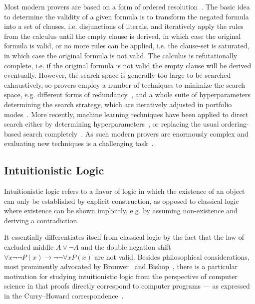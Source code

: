 \documentclass{article}
\theoremstyle{definition}
\theoremstyle{definition}
\theoremstyle{definition}
\theoremstyle{definition}
\theoremstyle{definition}
\theoremstyle{definition}
\theoremstyle{definition}
\newcommand{\0}{\mathbf 0}
\newcommand{\1}{\mathbf 1}
\begin{document}
	Most modern provers are based on a form of ordered resolution~\cite{bachmair2001resolution}. The basic idea to determine the validity of a given formula is to transform the negated formula into a set of clauses, i.e. disjunctions of literals, and iteratively apply the rules from the calculus until the empty clause is derived, in which case the original formula is valid, or no more rules can be applied, i.e. the clause-set is saturated, in which case the original formula is not valid. The calculus is refutationally complete, i.e. if the original formula is not valid the empty clause will be derived eventually. However, the search space is generally too large to be searched exhaustively, so provers employ a number of techniques to minimize the search space, e.g. different forms of redundancy~\cite{bachmair1994rewrite, hillenbrand2013search, gleiss2020subsumption}, and a whole suite of hyperparameters determining the search strategy, which are iteratively adjusted in portfolio modes~\cite{rawson2018dynamic}. More recently, machine learning techniques have been applied to direct search either by determining hyperparameters~\cite{bartek2020learning,bartek2023much}, or replacing the usual ordering-based search completely~\cite{jakubuuv2017enigma,kaliszyk2018reinforcement,crouse2021deep}. As such modern provers are enormously complex and evaluating new techniques is a challenging task~\cite{reger2014challenges}.


	\subsection{Intuitionistic Logic}

	Intuitionistic logic refers to a flavor of logic in which the existence of an object can only be established by explicit construction, as opposed to classical logic where existence can be shown implicitly, e.g. by assuming non-existence and deriving a contradiction.

	It essentially differentiates itself from classical logic by the fact that the law of excluded middle $A\vee\neg A$ and the double negation shift $\forall x\neg\neg P(x)\to\neg\neg\forall xP(x)$ are not valid.
	Besides philosophical considerations, most prominently advocated by Brouwer~\cite{brouwer1907over} and Bishop~\cite{bishop1967foundations}, there is a particular motivation for studying intuitionistic logic from the perspective of computer science in that proofs directly correspond to computer programs --- as expressed in the Curry--Howard correspondence~\cite{howard1980formulae}.
	
\end{document}
